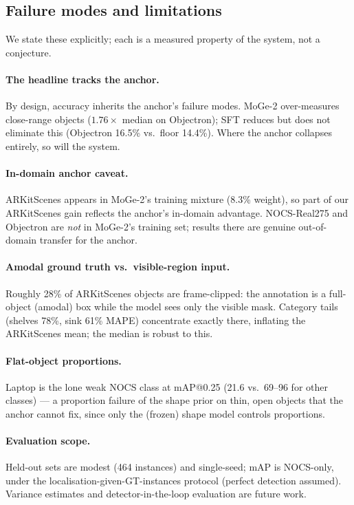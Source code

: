 \documentclass[runningheads]{llncs}
\begin{document}
\subsection{Failure modes and limitations}
\label{sec:failure}

We state these explicitly; each is a measured property of the system, not a conjecture.

\paragraph{The headline tracks the anchor.}
By design, accuracy inherits the anchor's failure modes. MoGe-2 over-measures close-range
objects ($1.76\times$ median on Objectron); SFT reduces but does not eliminate this
(Objectron 16.5\% vs.\ floor 14.4\%). Where the anchor collapses entirely, so will the
system.

\paragraph{In-domain anchor caveat.}
ARKitScenes appears in MoGe-2's training mixture (8.3\% weight), so part of our
ARKitScenes gain reflects the anchor's in-domain advantage. NOCS-Real275 and Objectron are
\emph{not} in MoGe-2's training set; results there are genuine out-of-domain transfer for
the anchor.

\paragraph{Amodal ground truth vs.\ visible-region input.}
Roughly 28\% of ARKitScenes objects are frame-clipped: the annotation is a full-object
(amodal) box while the model sees only the visible mask. Category tails (shelves 78\%,
sink 61\% MAPE) concentrate exactly there, inflating the ARKitScenes mean; the median is
robust to this.

\paragraph{Flat-object proportions.}
Laptop is the lone weak NOCS class at mAP@0.25 (21.6 vs.\ 69--96 for other classes) --- a
proportion failure of the shape prior on thin, open objects that the anchor cannot fix,
since only the (frozen) shape model controls proportions.

\paragraph{Evaluation scope.}
Held-out sets are modest (464 instances) and single-seed; mAP is NOCS-only, under the
localisation-given-GT-instances protocol (perfect detection assumed). Variance estimates
and detector-in-the-loop evaluation are future work.
\end{document}
